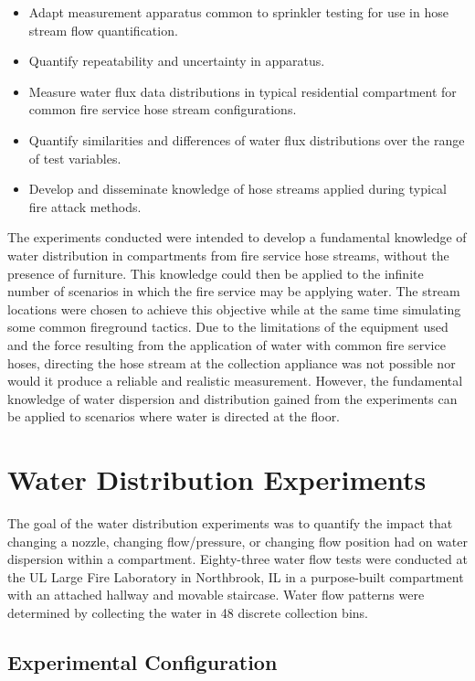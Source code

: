 \documentclass[12pt,oneside]{book}
\begin{document}
\begin{itemize}
	\setlength{\itemindent}{0.25in}
	\item Adapt measurement apparatus common to sprinkler testing for use in hose stream flow quantification.
	\item Quantify repeatability and uncertainty in apparatus.
	\item Measure water flux data distributions in typical residential compartment for common fire service hose stream configurations.
	\item Quantify similarities and differences of water flux distributions over the range of test variables.
	\item Develop and disseminate knowledge of hose streams applied during typical fire attack methods.
	\end{itemize}

The experiments conducted were intended to develop a fundamental knowledge of water distribution in compartments from fire service hose streams, without the presence of furniture. This knowledge could then be applied to the infinite number of scenarios in which the fire service may be applying water. The stream locations were chosen to achieve this objective while at the same time simulating some common fireground tactics. Due to the limitations of the equipment used and the force resulting from the application of water with common fire service hoses, directing the hose stream at the collection appliance was not possible nor would it produce a reliable and realistic measurement. However, the fundamental knowledge of water dispersion and distribution gained from the experiments can be applied to scenarios where water is directed at the floor. 

\chapter{Water Distribution Experiments}

The goal of the water distribution experiments was to quantify the impact that changing a nozzle, changing flow/pressure, or changing flow position had on water dispersion within a compartment. Eighty-three water flow tests were conducted at the UL Large Fire Laboratory in Northbrook, IL in a purpose-built compartment with an attached hallway and movable staircase. Water flow patterns were determined by collecting the water in 48 discrete collection bins.

\section{Experimental Configuration}
\end{document}
